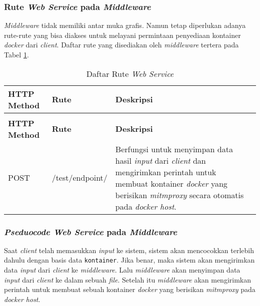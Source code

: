   \subsubsection{Rute \textit{Web Service} pada \textit{Middleware}}
  \textit{Middleware} tidak memiliki antar muka grafis. Namun tetap diperlukan adanya rute-rute yang bisa diakses untuk melayani permintaan penyediaan kontainer \textit{docker} dari \textit{client}. Daftar rute yang disediakan oleh \textit{middleware} tertera pada Tabel \ref{tabelRuteWebServiceDockerHost}.\\
  \begin{longtable}{|p{}|p{}|p{}|p{}|} %
  	
  	\caption{Daftar Rute \textit{Web Service}} \label{tabelRuteWebServiceDockerHost} \\
  	\hline
  	\textbf{HTTP Method} & \textbf{Rute} & \textbf{Deskripsi} \\ \hline
  	
  	\endfirsthead
  	\caption[]{Daftar Rute \textit{Web Service}}  \\
  	\hline
  	\textbf{HTTP Method} & \textbf{Rute} & \textbf{Deskripsi}  \\ \hline
  	
  	\endhead
  	\endfoot
  	\endlastfoot
  	
  	POST & /test/endpoint/ & Berfungsi untuk menyimpan data hasil \textit{input} dari \textit{client} dan mengirimkan perintah untuk membuat kontainer \textit{docker} yang berisikan \textit{mitmproxy} secara otomatis pada \textit{docker host}.\\ \hline
  \end{longtable}
  
  \subsubsection{\textit{Pseduocode Web Service} pada \textit{Middleware}}
  Saat \textit{client} telah memasukkan \textit{input} ke sistem, sistem akan mencocokkan terlebih dahulu dengan basis data \texttt{kontainer}. Jika benar, maka sistem akan mengirimkan data \textit{input} dari \textit{client} ke \textit{middleware}. Lalu \textit{middleware} akan menyimpan data \textit{input} dari \textit{client} ke dalam sebuah \textit{file}. Setelah itu \textit{middleware} akan mengirimkan perintah untuk membuat sebuah kontainer \textit{docker} yang berisikan \textit{mitmproxy} pada \textit{docker host}.
  
